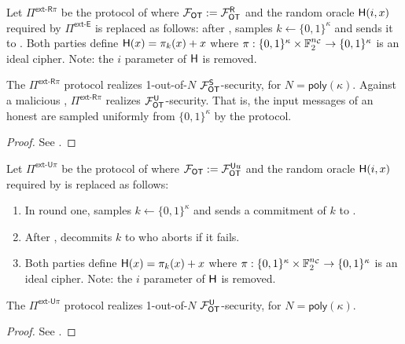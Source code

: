 \begin{definition}\label{def:ext_R_S}
	Let $\Pi^{\textsf{ext-R}\pi}$ be the protocol of  where $\mathcal{F}_{\mathsf{OT}}:=\mathcal{F}_{\mathsf{OT}}^\mathsf{R}$ and the random oracle $\mathsf{H}(i,x)$ required by $\Pi^{\textsf{ext-E}}$ is replaced as follows: after , \send samples $k\gets\{0,1\}^{\kappa}$ and sends it to \rec. Both parties define $\mathsf{H}(x)=\pi_k(x)+x$ where $\pi:\{0,1\}^{\kappa} \times \mathbb{F}^{{n_\mathcal{C}}}_2 \rightarrow\{0,1\}^\kappa$ is an ideal cipher. Note: the $i$ parameter of $\mathsf{H}$ is removed.
\end{definition}
\begin{lemma}\label{lem:ext_R_S}
	The $\Pi^{\textsf{ext-R}\pi}$ protocol realizes 1-out-of-$N$ $\mathcal{F}_{\mathsf{OT}}^\mathsf{S}$-security, for $N=\textsf{poly}(\kappa)$. Against a malicious \rec,  $\Pi^{\textsf{ext-R}\pi}$ realizes $\mathcal{F}_{\mathsf{OT}}^\mathsf{U}$-security. That is, the input messages of an honest \send are sampled uniformly from $\{0,1\}^\kappa$ by the protocol.
\end{lemma}
\iffullversion

\else
\begin{proof}
	See .
	\pe
\end{proof}
\fi

\begin{definition}\label{def:ext_U_U}
	Let $\Pi^{\textsf{ext-U}\pi}$ be the protocol of  where $\mathcal{F}_{\mathsf{OT}}:=\mathcal{F}_{\mathsf{OT}}^{\mathsf{U} u}$ and the random oracle $\mathsf{H}(i,x)$ required by  is replaced as follows:
	\begin{enumerate}
		\item In round one, \send samples $k\gets\{0,1\}^{\kappa}$ and sends a commitment of $k$ to \rec.
		\item After , \send decommits $k$ to \rec who aborts if it fails.
		\item Both parties define $\mathsf{H}(x)=\pi_k(x)+x$ where $\pi:\{0,1\}^{\kappa} \times \mathbb{F}^{{n_\mathcal{C}}}_2 \rightarrow\{0,1\}^\kappa$ is an ideal cipher. Note: the $i$ parameter of $\mathsf{H}$ is removed.
	\end{enumerate}
\end{definition}

\begin{lemma}\label{lem:ext_U_U}
	The $\Pi^{\textsf{ext-U}\pi}$ protocol realizes 1-out-of-$N$ $\mathcal{F}_{\mathsf{OT}}^\mathsf{U}$-security, for $N=\textsf{poly}(\kappa)$.
\end{lemma}
\iffullversion

\else
\begin{proof}
See .
\pe
\end{proof}
\fi

